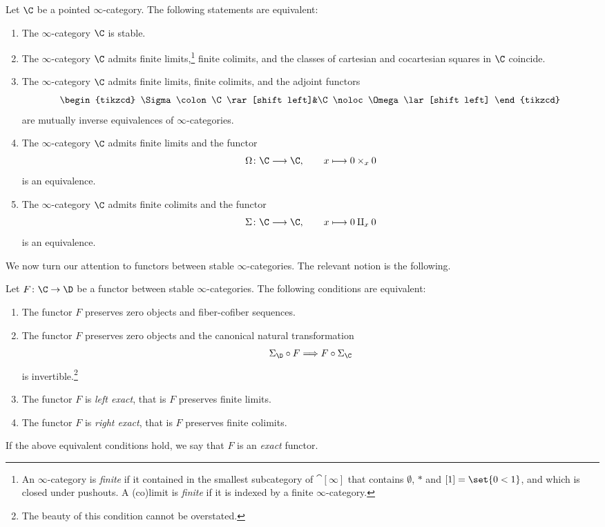 \documentclass[a4paper]{amsart}
\begin{document}
\begin{theorem}
  \label{thm:equivalent-def-stable}
  Let $\C$ be a pointed $\infty$-category. The following statements are
  equivalent:
  \begin{enumerate}
  \item The $\infty$-category $\C$ is stable.
  \item The $\infty$-category $\C$ admits finite limits,\footnote{An $\infty$-category is \emph{finite} if it contained in the smallest
      subcategory of $\cat[\infty]$ that contains $\emptyset$, $*$ and
      $[1]=\set{0<1}$, and which is closed under pushouts. A (co)limit is \emph{finite} if it is indexed by a finite
    $\infty$-category.} finite colimits, and
    the classes of cartesian and cocartesian squares in $\C$ coincide.
  \item The $\infty$-category $\C$ admits finite limits, finite colimits, and
    the adjoint functors
    \[
      \begin{tikzcd}
        \Sigma\colon\C\rar[shift left]&\C\noloc\Omega\lar[shift left]
      \end{tikzcd}
    \]
    are mutually inverse equivalences of $\infty$-categories.
  \item The $\infty$-category $\C$ admits finite limits and the functor
    \[
      \Omega\colon\C\longrightarrow\C,\qquad x\longmapsto 0\times_x0
    \]
    is an equivalence.
  \item The $\infty$-category $\C$ admits finite colimits and the functor
    \[
      \Sigma\colon\C\longrightarrow\C,\qquad x\longmapsto 0\amalg_x0
    \]
    is an equivalence.
  \end{enumerate}
\end{theorem}

We now turn our attention to functors between stable $\infty$-categories. The
relevant notion is the following.

\begin{defprop}
  \label{defprop:exact_functors}
  Let $F\colon\C\to\D$ be a functor between stable $\infty$-categories. The
  following conditions are equivalent:
  \begin{enumerate}
  \item The functor $F$ preserves zero objects and fiber-cofiber sequences.
  \item The functor $F$ preserves zero objects and the canonical natural
    transformation
    \[
      \Sigma_{\D}\circ F\Longrightarrow F\circ\Sigma_{\C}
    \]
    is invertible.\footnote{The beauty of this condition cannot be overstated.}
  \item The functor $F$ is \emph{left exact}, that is $F$ preserves finite
    limits.
  \item The functor $F$ is \emph{right exact}, that is $F$ preserves finite
    colimits.
  \end{enumerate}
  If the above equivalent conditions hold, we say that $F$ is an \emph{exact}
  functor.
\end{defprop}
\end{document}
